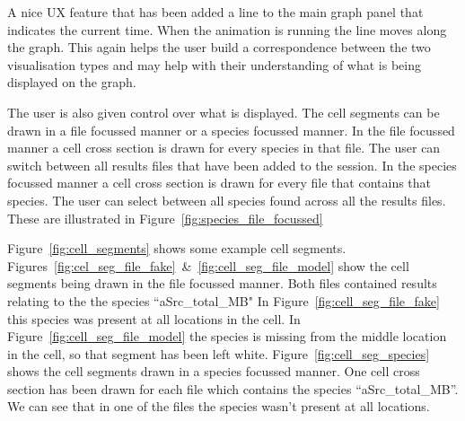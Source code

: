 A nice \ac{UX} feature that has been added a line to the main graph panel that indicates the current time.  When the animation is running the line moves along the graph.  This again helps the user build a correspondence between the two visualisation types and may help with their understanding of what is being displayed on the graph.

The user is also given control over what is displayed.  The cell segments can be drawn in a file focussed manner or a species focussed manner.  In the file focussed manner a cell cross section is drawn for every species in that file.  The user can switch between all results files that have been added to the session.  In the species focussed manner a cell cross section is drawn for every file that contains that species.  The user can select between all species found across all the results files.  These are illustrated in Figure~\ref{fig:species_file_focussed}

Figure~\ref{fig:cell_segments} shows some example cell segments.  Figures~\ref{fig:cel_seg_file_fake}~\&~\ref{fig:cell_seg_file_model} show the cell segments being drawn in the file focussed manner.  Both files contained results relating to the the species ``aSrc\_total\_MB" In Figure~\ref{fig:cell_seg_file_fake} this species was present at all locations in the cell.  In Figure~\ref{fig:cell_seg_file_model} the species is missing from the middle location in the cell, so that segment has been left white.  Figure~\ref{fig:cell_seg_species} shows the cell segments drawn in a species focussed manner.  One cell cross section has been drawn for each file which contains the species ``aSrc\_total\_MB''.  We can see that in one of the files the species wasn't present at all locations.

